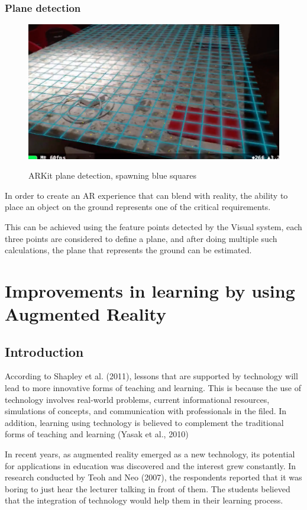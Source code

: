 \documentclass[12 pct]{report}
\begin{document}
\subsection*{Plane detection}
\begin{figure}[H]
\includegraphics[width=1\textwidth]{plane-detection}
\centering
\label{fig:plane-detection}
\caption{ARKit plane detection, spawning blue squares}
\end{figure}

In order to create an AR experience that can blend with reality, the ability to place an object on the ground represents one of the critical requirements. 

This can be achieved using the feature points detected by the Visual system, each three points are considered to define a plane, and after doing multiple such calculations, the plane that represents the ground can be estimated.

\chapter{Improvements in learning by using Augmented Reality}
\section{Introduction}
According to Shapley et al. (2011), lessons that are supported by technology will lead to more innovative forms of teaching and learning. This is because the use of technology involves real-world problems, current informational resources, simulations of concepts, and communication with professionals in the filed. In addition, learning using technology is believed to complement the traditional forms of teaching and learning (Yasak et al., 2010)

In recent years, as augmented reality emerged as a new technology, its potential for applications in education was discovered and the interest grew constantly. In research conducted by Teoh and Neo (2007), the respondents reported that it was boring to just hear the lecturer talking in front of them. The students believed that the integration of technology would help them in their learning process. 
\end{document}
